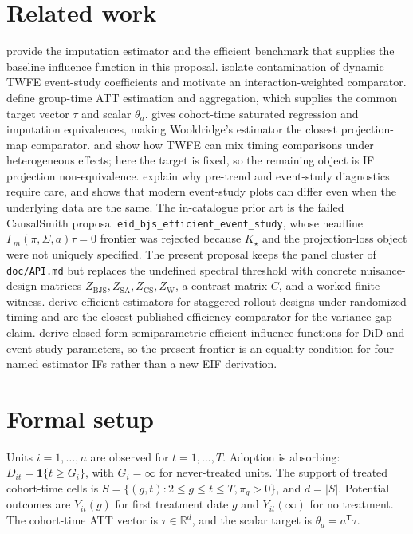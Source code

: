 \documentclass[11pt]{article}
\newcommand{\one}{\mathbf{1}}
\newcommand{\transpose}{\mathsf{T}}
\newcommand{\R}{\mathbb{R}}
\theoremstyle{definition}
\theoremstyle{plain}
\theoremstyle{remark}
\begin{document}
\section{Related work}
\citet[Section 2.3]{borusyak_jaravel_spiess_2024_restud} provide the imputation estimator and
the efficient benchmark that supplies the baseline influence function in this
proposal. \citet[Theorem 1]{sun_abraham_2021_joe} isolate contamination of dynamic TWFE
event-study coefficients and motivate an interaction-weighted comparator.
\citet[Sections 2--3]{callaway_santanna_2021_joe} define group-time ATT estimation and
aggregation, which supplies the common target vector \(\tau\) and scalar
\(\theta_a\). \citet[Proposition 5.1]{wooldridge_2023_ectj} gives cohort-time saturated
regression and imputation equivalences, making Wooldridge's estimator the
closest projection-map comparator. \citet[Theorem 1]{goodman_bacon_2021_joe} and
\citet[Proposition 1]{dechaisemartin_dhaultfoeuille_2020_aer} show how TWFE can mix timing
comparisons under heterogeneous effects; here the target is fixed, so the
remaining object is IF projection non-equivalence. \citet{roth_santanna_bilinski_poe_2023_joe}
explain why pre-trend and event-study diagnostics require care, and
\citet{roth_2026_eventstudy_note} shows that modern event-study plots can differ
even when the underlying data are the same. The in-catalogue prior art is the
failed CausalSmith proposal \texttt{eid\_bjs\_efficient\_event\_study}, whose
headline \(\Gamma_m(\pi,\Sigma,a)\tau=0\) frontier was rejected because
\(K_\star\) and the projection-loss object were not uniquely specified. The
present proposal keeps the panel cluster of \texttt{doc/API.md} but replaces the
undefined spectral threshold with concrete nuisance-design matrices
\(Z_{\mathrm{BJS}},Z_{\mathrm{SA}},Z_{\mathrm{CS}},Z_{\mathrm{W}}\), a contrast
matrix \(C\), and a worked finite witness. \citet{roth_santanna_2023_jpem}
derive efficient estimators for staggered rollout designs under randomized
timing and are the closest published efficiency comparator for the variance-gap
claim. \citet{chen_santanna_xie_2025} derive closed-form semiparametric
efficient influence functions for DiD and event-study parameters, so the
present frontier is an equality condition for four named estimator IFs rather
than a new EIF derivation.

\section{Formal setup}
Units \(i=1,\ldots,n\) are observed for \(t=1,\ldots,T\). Adoption is absorbing:
\(D_{it}=\one\{t\ge G_i\}\), with \(G_i=\infty\) for never-treated units. The
support of treated cohort-time cells is \(S=\{(g,t):2\le g\le t\le T,\pi_g>0\}\),
and \(d=|S|\). Potential outcomes are \(Y_{it}(g)\) for first treatment date
\(g\) and \(Y_{it}(\infty)\) for no treatment. The cohort-time ATT vector is
\(\tau\in\R^d\), and the scalar target is \(\theta_a=a^\transpose\tau\).
\end{document}
